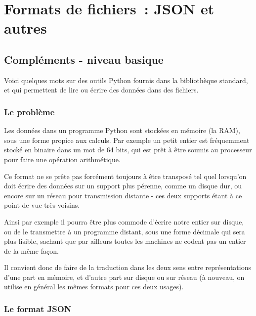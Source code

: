     
    
    
    

    

    \hypertarget{formats-de-fichiers-json-et-autres}{%
\section{Formats de fichiers~: JSON et
autres}\label{formats-de-fichiers-json-et-autres}}

    \hypertarget{compluxe9ments---niveau-basique}{%
\subsection{Compléments - niveau
basique}\label{compluxe9ments---niveau-basique}}

    Voici quelques mots sur des outils Python fournis dans la bibliothèque
standard, et qui permettent de lire ou écrire des données dans des
fichiers.

    \hypertarget{le-probluxe8me}{%
\subsubsection{Le problème}\label{le-probluxe8me}}

    Les données dans un programme Python sont stockées en mémoire (la RAM),
sous une forme propice aux calculs. Par exemple un petit entier est
fréquemment stocké en binaire dans un mot de 64 bits, qui est prêt à
être soumis au processeur pour faire une opération arithmétique.

    Ce format ne se prête pas forcément toujours à être transposé tel quel
lorsqu'on doit écrire des données sur un support plus pérenne, comme un
disque dur, ou encore sur un réseau pour transmission distante - ces
deux supports étant à ce point de vue très voisins.

Ainsi par exemple il pourra être plus commode d'écrire notre entier sur
disque, ou de le transmettre à un programme distant, sous une forme
décimale qui sera plus lisible, sachant que par ailleurs toutes les
machines ne codent pas un entier de la même façon.

    Il convient donc de faire de la traduction dans les deux sens entre
représentations d'une part en mémoire, et d'autre part sur disque ou sur
réseau (à nouveau, on utilise en général les mêmes formats pour ces deux
usages).

    \hypertarget{le-format-json}{%
\subsubsection{Le format JSON}\label{le-format-json}}

